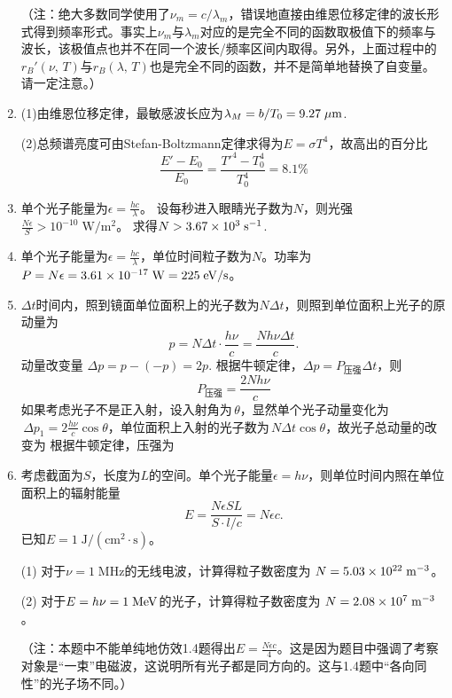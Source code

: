 \begin{enumerate}[label=1.\arabic*, leftmargin=-0.5mm]
{\color{red}（注：绝大多数同学使用了$\nu_m = c/\lambda_m$，错误地直接由维恩位移定律的波长形式得到频率形式。事实上$\nu_m$与$\lambda_m$对应的是完全不同的函数取极值下的频率与波长，该极值点也并不在同一个波长/频率区间内取得。另外，上面过程中的$r_B'(\nu,\,T)$与$r_B(\lambda,\,T)$也是完全不同的函数，并不是简单地替换了自变量。请一定注意。）}

\item
(1)由维恩位移定律，最敏感波长应为$\lambda_M= b/T_0 = 9.27\;\mathrm{\mu m}$.

(2)总频谱亮度可由Stefan-Boltzmann定律求得为$E=\sigma T^4$，故高出的百分比
\[\frac{E'-E_0}{E_0} = \frac{T'^4-T_0^4}{T_0^4} = 8.1\%\]

\item
单个光子能量为$\epsilon = \frac{hc}{\lambda}$。
设每秒进入眼睛光子数为$N$，则光强$\frac{N\epsilon}{S}>10^{-10}\;\mathrm{W/m^2}$。
求得$N>3.67\times 10^{3}\;\mathrm{s^{-1}}$.

\item
单个光子能量为$\epsilon = \frac{hc}{\lambda}$，单位时间粒子数为$N$。功率为$P = N\epsilon = 3.61\times 10^{-17}\;\mathrm{W} = 225\;\mathrm{eV/s}$。

\item
$\Delta t$时间内，照到镜面单位面积上的光子数为$N\Delta t$，则照到单位面积上光子的原动量为
\[p = N\Delta t\cdot \frac{h\nu}{c} = \frac{Nh\nu\Delta t}{c}.\]
动量改变量
$\Delta p = p-(-p) = 2p $.
根据牛顿定律，$\Delta p = P_\text{压强}\Delta t$，则
\[P_\text{压强} = \frac{2Nh\nu}{c}\]
如果考虑光子不是正入射，设入射角为$\,\theta$，显然单个光子动量变化为$\,\Delta p_1=2\frac{h\nu}{c}\cos\theta$，单位面积上入射的光子数为$\,N\Delta t\cos\theta$，故光子总动量的改变为
根据牛顿定律，压强为

\item
考虑截面为$S$，长度为$L$的空间。单个光子能量$\epsilon = h\nu$，则单位时间内照在单位面积上的辐射能量
\[E = \frac{N\epsilon SL}{S\cdot l/c} = N\epsilon c.\]
已知$E=1\;\mathrm{J/(cm^2\cdot s)}$。

(1) 对于$\nu=1\;\mathrm{MHz}$的无线电波，计算得粒子数密度为
$N = 5.03\times 10^{22}\;\mathrm{m^{-3}}$。

(2) 对于$E=h\nu=1\;\mathrm{MeV}$的光子，计算得粒子数密度为
$N = 2.08\times 10^{7}\;\mathrm{m^{-3}}$。

{\color{red}（注：本题中不能单纯地仿效1.4题得出$E = \frac{N\epsilon c}{4}$。这是因为题目中强调了考察对象是“一束”电磁波，这说明所有光子都是同方向的。这与1.4题中“各向同性”的光子场不同。）}


\end{enumerate}
